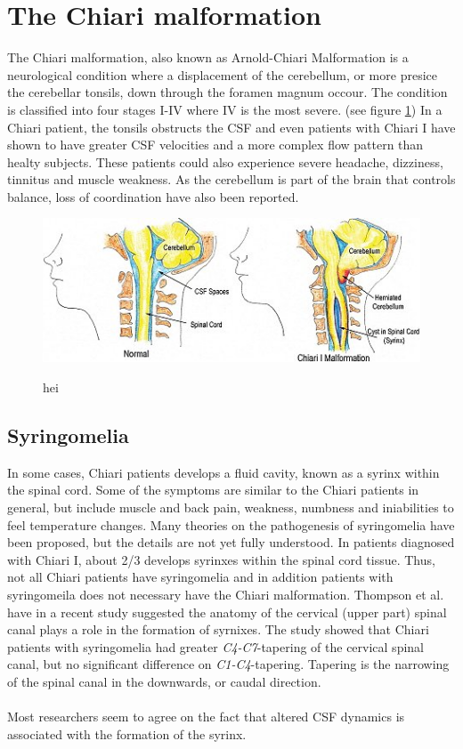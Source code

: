 \section{The Chiari malformation}
The Chiari malformation, also known as Arnold-Chiari Malformation is a neurological condition where a displacement of the cerebellum, or more presice the cerebellar tonsils, down through the foramen magnum occour. The condition is classified into four stages I-IV where IV is the most severe. (see figure \ref{CSF}) In a Chiari patient, the tonsils obstructs the CSF and even patients with Chiari I have shown to have greater CSF velocities and a more complex flow pattern than healty subjects. \cite{Quig04} These patients could also experience severe headache, dizziness, tinnitus and muscle weakness. As the cerebellum is part of the brain that controls balance, loss of coordination have also been reported. 
\begin{figure}[!ht]
\includegraphics[scale=0.8]{figures/Ida_CSF.png} \label{CSF}
\caption{hei}
\end{figure}
\subsection{Syringomelia}
In some cases, Chiari patients develops a fluid cavity, known as a syrinx within the spinal cord. Some of the symptoms are similar to the Chiari patients in general, but include muscle and back pain, weakness, numbness and iniabilities to feel temperature changes. Many theories on the pathogenesis of syringomelia have been proposed, but the details are not yet fully understood. In patients diagnosed with Chiari I, about 2/3 develops syrinxes within the spinal cord tissue. Thus, not all Chiari patients have syringomelia and in addition patients with syringomeila does not necessary have the Chiari malformation. Thompson et al. have in a recent study suggested the anatomy of the cervical (upper part) spinal canal plays a role in the formation of syrnixes. \cite{Thom15} The study showed that Chiari patients with syringomelia had greater \textit{C4-C7}-tapering of the cervical spinal canal, but no significant difference on \textit{C1-C4}-tapering. Tapering is the narrowing of the spinal canal in the downwards, or caudal direction. 
\\
\\
Most researchers seem to agree on the fact that altered CSF dynamics is associated with the formation of the syrinx. 
